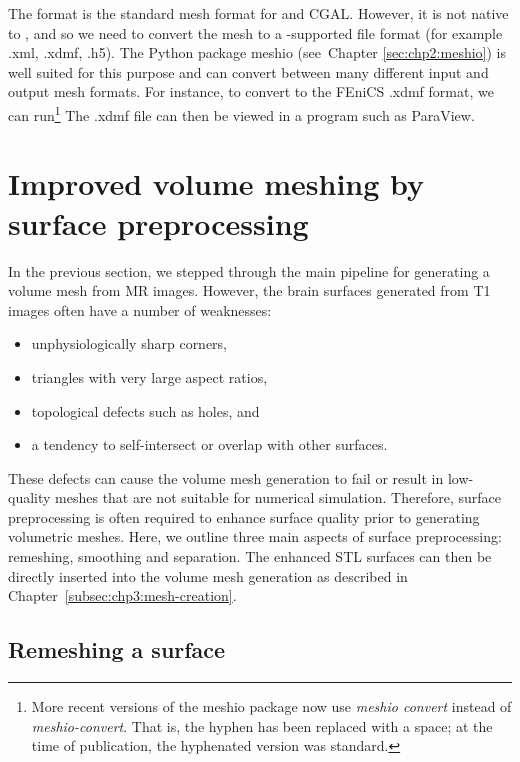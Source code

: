 The  format is the standard mesh format for \svmtk{} and
CGAL. However, it is not native to \fenics{}, and so we need to
convert the mesh to a \fenics-supported file format (for example .xml, .xdmf,
.h5). The Python package meshio (see~Chapter
\ref{sec:chp2:meshio}) is well suited for this purpose and can
convert between many different input and output mesh formats. For
instance, to convert to the FEniCS .xdmf format, we can run\footnote{More recent versions of the meshio package now use \textit{meshio convert} instead of \textit{meshio-convert}.  That is, the hyphen has been replaced with a space; at the time of publication, the hyphenated version was standard.}
\noindent The .xdmf file can then be viewed in a program such as ParaView.

\section{Improved volume meshing by surface preprocessing}
\label{sec:chp3:improved-volume-meshing}
In the previous section, we stepped through the main pipeline for
generating a volume mesh from MR images. However, the brain surfaces
generated from T1 images often have a number of weaknesses:
\begin{itemize}
\item unphysiologically sharp corners,   
\item triangles with very large aspect ratios, 
\item topological defects such as holes, and
\item a tendency to self-intersect or overlap with other surfaces.  
\end{itemize}
These defects can cause the volume mesh generation to fail or result
in low-quality meshes that are not suitable for numerical
simulation. Therefore, surface preprocessing is often required to
enhance surface quality prior to generating volumetric meshes. Here,
we outline three main aspects of surface preprocessing: remeshing,
smoothing and separation. The enhanced STL surfaces can then be
directly inserted into the volume mesh generation as described in
Chapter~\ref{subsec:chp3:mesh-creation}.

\subsection{Remeshing a surface}
\label{subsubsec:chp3:mesh-creation:remeshing}

